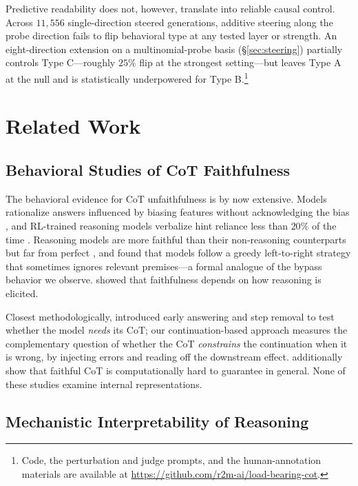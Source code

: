 \documentclass[10pt]{article} %
\begin{document}
Predictive readability does not, however, translate into reliable causal control. Across $11{,}556$ single-direction steered generations, additive steering along the probe direction fails to flip behavioral type at any tested layer or strength. An eight-direction extension on a multinomial-probe basis (\S\ref{sec:steering}) partially controls Type C---roughly $25\%$ flip at the strongest setting---but leaves Type A at the null and is statistically underpowered for Type B.\footnote{Code, the perturbation and judge prompts, and the human-annotation materials are available at \url{https://github.com/r2m-ai/load-bearing-cot}.}


\section{Related Work}
\label{sec:related}

\subsection{Behavioral Studies of CoT Faithfulness}

The behavioral evidence for CoT unfaithfulness is by now extensive. Models rationalize answers influenced by biasing features without acknowledging the bias \citep{turpin2023}, and RL-trained reasoning models verbalize hint reliance less than $20\%$ of the time \citep{chen2025a}. Reasoning models are more faithful than their non-reasoning counterparts but far from perfect \citep{chua2025, barez2025a, cornish2025}, and \citet{saparov2023} found that models follow a greedy left-to-right strategy that sometimes ignores relevant premises---a formal analogue of the bypass behavior we observe. \citet{radhakrishnan2023} showed that faithfulness depends on how reasoning is elicited.

Closest methodologically, \citet{lanham2023} introduced early answering and step removal to test whether the model \emph{needs} its CoT; our continuation-based approach measures the complementary question of whether the CoT \emph{constrains} the continuation when it is wrong, by injecting errors and reading off the downstream effect. \citet{tanneru2024} additionally show that faithful CoT is computationally hard to guarantee in general. None of these studies examine internal representations.

\subsection{Mechanistic Interpretability of Reasoning}
\end{document}
